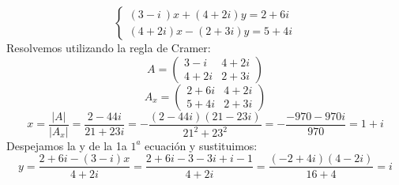 \documentclass[12pt,a4paper,oneside,onecolumn]{article}
\begin{document}
    \section{}
    \[
        \begin{cases}
            (3 - i\ )x + (4 + 2i)y = 2 + 6i \\ 
            (4 + 2i)x - (2 + 3i)y = 5 + 4i
        \end{cases}
    \]
    Resolvemos utilizando la regla de Cramer:
    \[
        A = \begin{pmatrix}
            3 - i & 4 + 2i \\
            4 + 2i & 2 + 3i 
            \end{pmatrix}
    \]
    \[
        A_x = \begin{pmatrix}
            2 + 6i & 4 + 2i \\
            5 + 4i & 2 + 3i 
            \end{pmatrix}
    \]
    \[
        x = \frac{|A|}{|A_x|} = \frac{2 - 44i}{21+23i} = - \frac{(2 - 44i)(21-23i)}{21^2 + 23^2} = -\frac{-970 - 970i}{970}= 1 + i
    \]
    Despejamos la y de la 1a $1^a$ ecuaci\'on y sustituimos:
    \[
        y = \frac{2 + 6i -(3-i)x}{4+2i} = \frac{2 + 6i -3 -3i +i -1}{4 + 2i} = \frac{(-2+4i)(4-2i)}{16 + 4} = i
    \]

\end{document}
